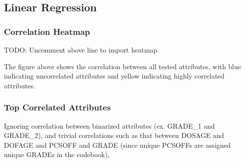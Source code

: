 \documentclass[]{article}
\begin{document}
\subsection{Linear Regression}

\subsubsection{Correlation Heatmap}

TODO: Uncomment above line to import heatmap

The figure above shows the correlation between all tested attributes, 
with blue indicating uncorrelated attributes and yellow indicating highly correlated attributes.

\subsubsection{Top Correlated Attributes}
Ignoring correlation between binarized attributes (ex. GRADE\_1 and GRADE\_2), 
and trivial correlations such as that between DOSAGE and DOFAGE and PCSOFF and GRADE (since unique PCSOFFs are assigned unique GRADEs in the codebook),
\end{document}
